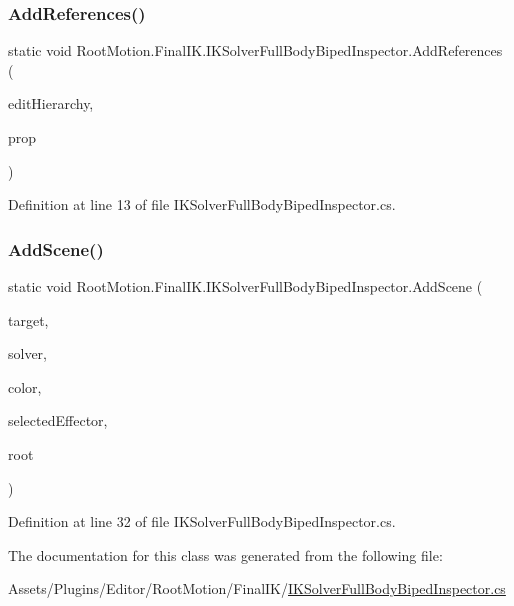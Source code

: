 \subsubsection{\texorpdfstring{Add\+References()}{AddReferences()}}
{\footnotesize\ttfamily static void Root\+Motion.\+Final\+I\+K.\+I\+K\+Solver\+Full\+Body\+Biped\+Inspector.\+Add\+References (\begin{DoxyParamCaption}\item[{bool}]{edit\+Hierarchy,  }\item[{Serialized\+Property}]{prop }\end{DoxyParamCaption})\hspace{0.3cm}{\ttfamily [static]}}



Definition at line 13 of file I\+K\+Solver\+Full\+Body\+Biped\+Inspector.\+cs.

\mbox{\label{class_root_motion_1_1_final_i_k_1_1_i_k_solver_full_body_biped_inspector_af1f17688b3fd698de2145a7480f75886}} 
\subsubsection{\texorpdfstring{Add\+Scene()}{AddScene()}}
{\footnotesize\ttfamily static void Root\+Motion.\+Final\+I\+K.\+I\+K\+Solver\+Full\+Body\+Biped\+Inspector.\+Add\+Scene (\begin{DoxyParamCaption}\item[{\mbox{\hyperlink{_triangles_8cs_aef19bab18b9814edeef255c43e4f6bbc}{Unity\+Engine.\+Object}}}]{target,  }\item[{I\+K\+Solver\+Full\+Body\+Biped}]{solver,  }\item[{Color}]{color,  }\item[{ref int}]{selected\+Effector,  }\item[{Transform}]{root }\end{DoxyParamCaption})\hspace{0.3cm}{\ttfamily [static]}}



Definition at line 32 of file I\+K\+Solver\+Full\+Body\+Biped\+Inspector.\+cs.



The documentation for this class was generated from the following file\+:\begin{DoxyCompactItemize}
\item 
Assets/\+Plugins/\+Editor/\+Root\+Motion/\+Final\+I\+K/\mbox{\hyperlink{_i_k_solver_full_body_biped_inspector_8cs}{I\+K\+Solver\+Full\+Body\+Biped\+Inspector.\+cs}}\end{DoxyCompactItemize}
